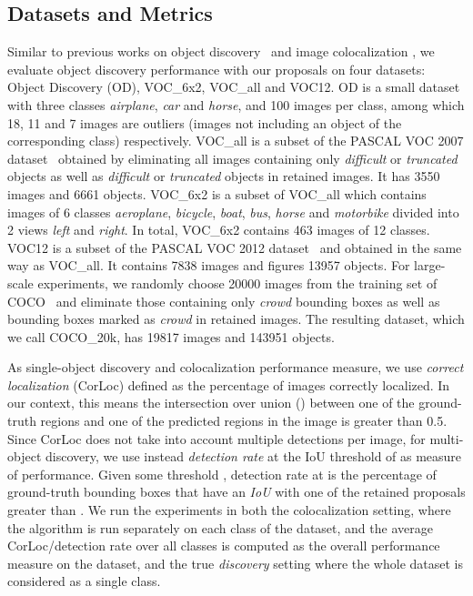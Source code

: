 \documentclass[runningheads]{llncs}
\begin{document}
\subsection{Datasets and Metrics}
\label{sec:datasets_and_metrics}
Similar to previous works on object discovery~\cite{CKSP15,Vo2019UnsupOptim} and image colocalization \cite{Li2016mimick,Wei2019ddtplus}, we evaluate object discovery performance with our proposals on four datasets: Object Discovery (OD), VOC\_6x2, VOC\_all and VOC12. OD is a small dataset with three classes \textit{airplane}, \textit{car} and \textit{horse}, and 100 images per class, among which 18, 11 and 7 images are outliers (images not including an object of the corresponding class) respectively. VOC\_all is a subset of the PASCAL VOC 2007 dataset~\cite{pascal-voc-2007}  obtained by eliminating all images containing only \textit{difficult} or \textit{truncated} objects as well as \textit{difficult} or \textit{truncated} objects in retained images. It has 3550 images and 6661 objects. VOC\_6x2 is a subset of VOC\_all which contains images of 6 classes \textit{aeroplane}, \textit{bicycle}, \textit{boat}, \textit{bus}, \textit{horse} and \textit{motorbike} divided into 2 views \textit{left} and \textit{right}. In total, VOC\_6x2 contains 463 images of 12 classes. VOC12 is a subset of the PASCAL VOC 2012 dataset~\cite{pascal-voc-2012} and obtained in the same way as VOC\_all. It contains 7838 images and figures 13957 objects. For large-scale experiments, we randomly choose 20000 images from the training set of COCO~\cite{Lin2014cocodataset} and eliminate those containing only \textit{crowd} bounding boxes as well as bounding boxes marked as \textit{crowd} in retained images. The resulting dataset, which we call COCO\_20k, has 19817 images and 143951 objects.

As single-object discovery and colocalization performance measure, we use \textit{correct localization} (CorLoc) defined as the percentage of images correctly localized. In our context, this means the intersection over union () between one of the ground-truth regions and one of the predicted regions in the image is greater than 0.5. Since CorLoc does not take into account multiple detections per image, for multi-object discovery, we use instead \textit{detection rate} at the IoU threshold of  as measure of performance. Given some threshold , detection rate at  is the percentage of ground-truth bounding boxes that have an \textit{IoU} with one of the retained proposals greater than . We run the experiments in both the colocalization setting, where the algorithm is run separately on each class of the dataset, and the average CorLoc/detection rate over all classes is computed as the overall performance measure on the dataset, and the true \textit{discovery} setting where the whole dataset is considered as a single class.
\end{document}
